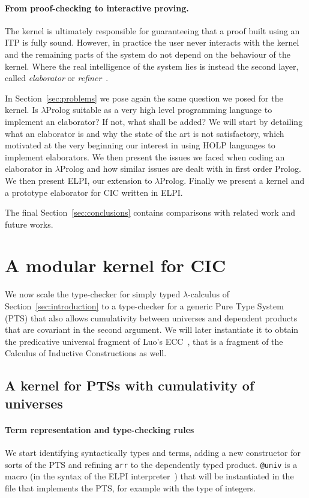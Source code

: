 \documentclass{easychair}
\begin{document}
\paragraph{From proof-checking to interactive proving.}

The kernel is ultimately responsible for guaranteeing that a proof
built using an ITP is fully sound. However, in practice the user never
interacts with the kernel and the remaining parts of the system do not
depend on the behaviour of the kernel. Where the real intelligence of
the system lies is instead the second layer, called \emph{elaborator}
or \emph{refiner}~\cite{leanelaborator,bidir}.

In Section~\ref{sec:problems} we pose again the same question we posed for the kernel. Is $\lambda$Prolog suitable as a very high level programming language to implement an elaborator? If not, what shall be added?
We will start by detailing what an elaborator is and why the state of the art is not satisfactory, which motivated at the very beginning our interest in using HOLP languages to implement elaborators. We then present the issues we faced when coding an elaborator in $\lambda$Prolog and how similar issues are dealt with in first order Prolog. We then present ELPI, our extension to $\lambda$Prolog.  Finally we present a kernel and a prototype elaborator for CIC written in ELPI.

The final Section~\ref{sec:conclusions} contains comparisons with related work and future works.

\section{A modular kernel for CIC}\label{sec:kernel}

We now scale the type-checker for simply typed $\lambda$-calculus of Section~\ref{sec:introduction} to a type-checker for a generic Pure Type System (PTS) that also allows cumulativity between universes and dependent products that are covariant in the second argument. We will later instantiate it to obtain the predicative universal fragment of Luo's ECC~\cite{ecc}, that is a fragment of the Calculus of Inductive Constructions as well.

\subsection{A kernel for PTSs with cumulativity of universes}\label{sec:kernelpts}
\paragraph{Term representation and type-checking rules}
We start identifying syntactically types and terms, adding a new constructor for sorts of the PTS and refining \verb+arr+ to the dependently typed product.
\verb+@univ+ is a macro (in the syntax of the ELPI interpreter~\cite{elpiLPAR}) that will be instantiated in the file that implements the PTS, for example with the type of integers.
\end{document}
